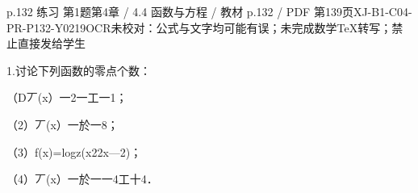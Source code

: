 \begin{bankitem}{p.132 练习 第1题}{第4章 / 4.4 函数与方程 / 教材 p.132 / PDF 第139页}{XJ-B1-C04-PR-P132-Y0219}{OCR未校对：公式与文字均可能有误；未完成数学TeX转写；禁止直接发给学生}
\begin{ocrdraft}
\par
1.讨论下列函数的零点个数：
\par
（D丆(x）一2一工一1；
\par
（2）丆(x）一於一8；
\par
（3）f(x)=logz(x22x—2)；
\par
（4）丆(x）一於一一4工十4．
\end{ocrdraft}
\end{bankitem}
